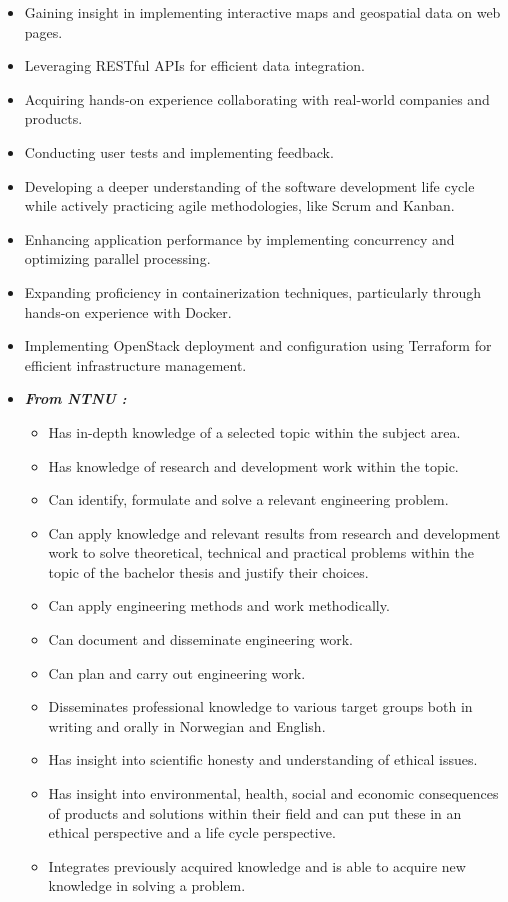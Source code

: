 \begin{itemize}
    \item Gaining insight in implementing interactive maps and geospatial data on web pages.
    \item Leveraging RESTful APIs for efficient data integration.
    \item Acquiring hands-on experience collaborating with real-world companies and products.
    \item Conducting user tests and implementing feedback. 
    \item Developing a deeper understanding of the software development life cycle while actively practicing agile methodologies, like Scrum and Kanban.
    \item Enhancing application performance by implementing concurrency and optimizing parallel processing.
    \item Expanding proficiency in containerization techniques, particularly through hands-on experience with Docker.
    \item Implementing OpenStack deployment and configuration using Terraform for efficient infrastructure management.
    \item \textit{\textbf{From NTNU \cite{ntnu_idatg2900}:}}
    \begin{itemize}
        \item Has in-depth knowledge of a selected topic within the subject area.
        \item Has knowledge of research and development work within the topic.
        \item Can identify, formulate and solve a relevant engineering problem.
        \item Can apply knowledge and relevant results from research and development work to solve theoretical, technical and practical problems within the topic of the bachelor thesis and justify their choices.
        \item Can apply engineering methods and work methodically.
        \item Can document and disseminate engineering work.
        \item Can plan and carry out engineering work.
        \item Disseminates professional knowledge to various target groups both in writing and orally in Norwegian and English.
        \item Has insight into scientific honesty and understanding of ethical issues.
        \item Has insight into environmental, health, social and economic consequences of products and solutions within their field and can put these in an ethical perspective and a life cycle perspective.
        \item Integrates previously acquired knowledge and is able to acquire new knowledge in solving a problem.
    \end{itemize}
\end{itemize}

